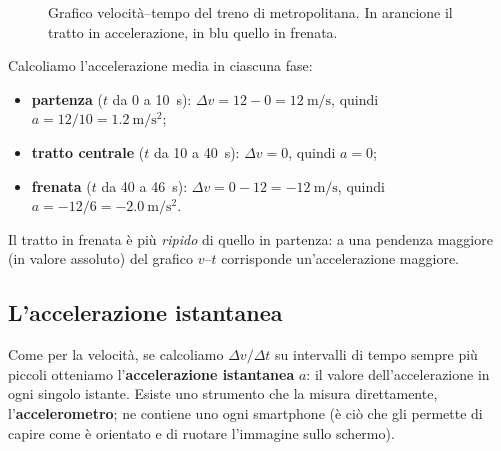 \begin{figure}[!htbp]
    \centering
    \caption{Grafico velocità--tempo del treno di metropolitana. In arancione il tratto in accelerazione, in blu quello in frenata.}
    \label{fig:vt-metro}
\end{figure}

Calcoliamo l'accelerazione media in ciascuna fase:
\begin{itemize}
    \item \textbf{partenza} ($t$ da 0 a \SI{10}{\second}): $\Delta v = 12 - 0 = \SI{12}{\metre\per\second}$, quindi $a = 12 / 10 = \SI{1,2}{\metre\per\second\squared}$;
    \item \textbf{tratto centrale} ($t$ da 10 a \SI{40}{\second}): $\Delta v = 0$, quindi $a = 0$;
    \item \textbf{frenata} ($t$ da 40 a \SI{46}{\second}): $\Delta v = 0 - 12 = \SI{-12}{\metre\per\second}$, quindi $a = -12 / 6 = \SI{-2,0}{\metre\per\second\squared}$.
\end{itemize}
Il tratto in frenata è più \emph{ripido} di quello in partenza: a una pendenza maggiore (in valore assoluto) del grafico $v$--$t$ corrisponde un'accelerazione maggiore.

\subsection{L'accelerazione istantanea}
Come per la velocità, se calcoliamo $\Delta v / \Delta t$ su intervalli di tempo sempre più piccoli otteniamo l'\textbf{accelerazione istantanea} $a$: il valore dell'accelerazione in ogni singolo istante. Esiste uno strumento che la misura direttamente, l'\textbf{accelerometro}; ne contiene uno ogni smartphone (è ciò che gli permette di capire come è orientato e di ruotare l'immagine sullo schermo).


